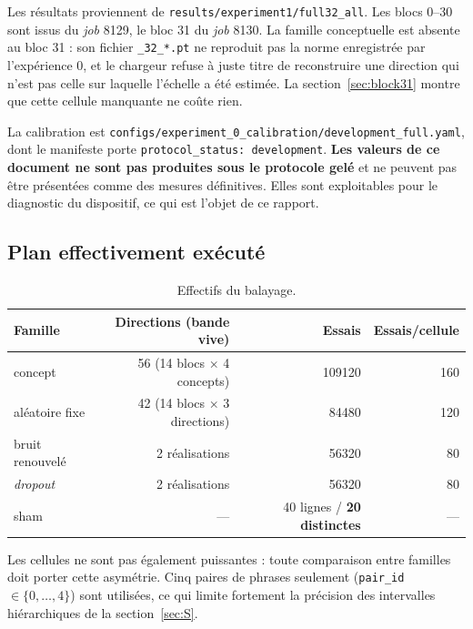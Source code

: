 \documentclass[11pt,a4paper]{article}
\newcommand{\code}[1]{\texttt{\small #1}}
\begin{document}
Les résultats proviennent de \code{results/experiment1/full32\_all}. Les blocs 0--30 sont
issus du \emph{job} \num{8129}, le bloc 31 du \emph{job} \num{8130}. La famille
conceptuelle est absente au bloc 31 : son fichier \code{*\_32\_*.pt} ne reproduit pas la
norme enregistrée par l'expérience 0, et le chargeur refuse à juste titre de reconstruire
une direction qui n'est pas celle sur laquelle l'échelle a été estimée. La
section~\ref{sec:block31} montre que cette cellule manquante ne coûte rien.

La calibration est \code{configs/experiment\_0\_calibration/development\_full.yaml}, dont
le manifeste porte \code{protocol\_status: development}. \textbf{Les valeurs de ce
document ne sont pas produites sous le protocole gelé} et ne peuvent pas être présentées
comme des mesures définitives. Elles sont exploitables pour le diagnostic du dispositif,
ce qui est l'objet de ce rapport.

\subsection{Plan effectivement exécuté}

\begin{table}[h]
\centering
\caption{Effectifs du balayage.}
\begin{tabular}{lrrr}
\toprule
Famille & Directions (bande vive) & Essais & Essais/cellule \\
\midrule
concept          & 56 (14 blocs $\times$ 4 concepts)  & \num{109120} & 160 \\
aléatoire fixe   & 42 (14 blocs $\times$ 3 directions) & \num{84480}  & 120 \\
bruit renouvelé  & 2 réalisations                      & \num{56320}  & 80 \\
\emph{dropout}   & 2 réalisations                      & \num{56320}  & 80 \\
\midrule
sham             & ---                                 & 40 lignes / \textbf{20 distinctes} & --- \\
\bottomrule
\end{tabular}
\end{table}

\noindent
Les cellules ne sont pas également puissantes : toute comparaison entre familles doit
porter cette asymétrie. Cinq paires de phrases seulement (\code{pair\_id} $\in
\{0,\dots,4\}$) sont utilisées, ce qui limite fortement la précision des intervalles
hiérarchiques de la section~\ref{sec:S}.
\end{document}
